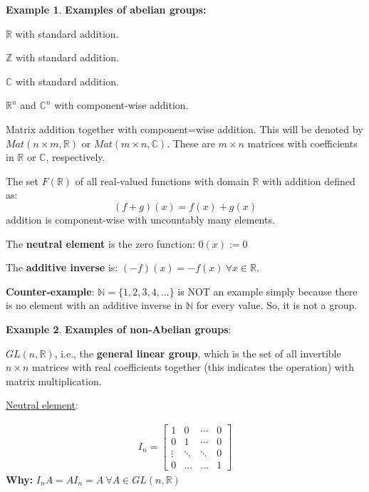 \documentclass[a4paper, 12pt]{article}
\theoremstyle{definition}
\newtheorem{exmp}{Example}[section]
\theoremstyle{definition}
\theoremstyle{definition}
\theoremstyle{definition}
\newenvironment{enumerate_tight}{
	\begin{enumerate}
		\setlength{\itemsep}{0pt}
		\setlength{\parskip}{0pt}
	}{\end{enumerate}}
\newenvironment{itemize_tight}{
	\begin{itemize}
		\setlength{\itemsep}{0pt}
		\setlength{\parskip}{0pt}
	}{\end{itemize}}
\begin{document}
{\begin{exmp}
	\textbf{Examples of abelian groups:}
	\begin{itemize_tight}
		\item $\mathbb{R}$ with standard addition. 
		\item $\mathbb{Z}$ with standard addition. 
		\item $\mathbb{C}$ with standard addition. 
		\item $\mathbb{R}^n$ and $\mathbb{C}^n$ with component-wise addition. 
		\item Matrix addition together with component=wise addition. This will be denoted by $Mat(n \times m, \mathbb{R})$ or $Mat(m \times n, \mathbb{C})$. These are $m \times n$ matrices with coefficients in $\mathbb{R}$ or $\mathbb{C}$, respectively. 
		\item The set $F(\mathbb{R})$ of all real-valued functions with domain $\mathbb{R}$ with addition defined as: $$ (f + g)(x) = f(x) + g(x)$$ addition is component-wise with uncountably many elements. 
		\begin{enumerate_tight}
			\item The \textbf{neutral element} is the zero function: $0(x):= 0$
			\item The \textbf{additive inverse} is: $(-f)(x) = -f(x)\ \forall x \in \mathbb{R}$. 
		\end{enumerate_tight}
		\item \textbf{Counter-example}: $\mathbb{N} = \{1,2,3,4,...\} $ is NOT an example simply because there is no element with an additive inverse in $\mathbb{N} $ for every value. So, it is not a group. 
	\end{itemize_tight}
\end{exmp}

\begin{exmp}
	\textbf{Examples of non-Abelian groups}: 
	\begin{itemize_tight}
		\item $GL(n, \mathbb{R})$, i.e., the \textbf{general linear group}, which is the set of all invertible $n \times n$ matrices with real coefficients together (this indicates the operation) with matrix multiplication. 
		\begin{enumerate_tight}
			\item \underline{Neutral element}:
			
			\begin{align}
				I_n = \begin{bmatrix}
					1 & 0 & \cdots & 0\\
					0 & 1 & \cdots & 0 \\ 
					\vdots & \ddots & \ddots & 0 \\ 
					0 & \hdots & \hdots & 1 
				\end{bmatrix}
			\end{align}
		\textbf{Why: }$I_nA = AI_n = A\ \forall A \in GL(n, \mathbb{R})$
		

\end{enumerate_tight}
\end{itemize_tight}
\end{exmp}}
\end{document}
